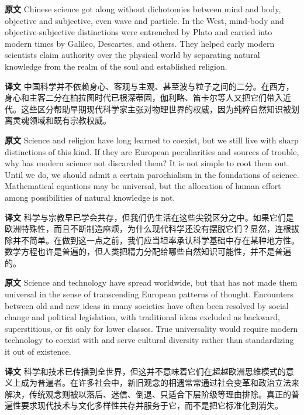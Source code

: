 \documentclass[UTF8,zihao=-4]{ctexart}
\newcommand{\BodyFont}{\fontsize{10.5pt}{15.5pt}\selectfont}
\newcommand{\origlabel}{\textbf{原文}\quad}
\newcommand{\translabel}{\textbf{译文}\quad}
\newenvironment{enblock}{\par\noindent\begingroup\BodyFont\origlabel}{\par\endgroup}
\newenvironment{zhblock}{\par\noindent\begingroup\BodyFont\translabel}{\par\endgroup\vspace{0.35em}}
\begin{document}
\begin{enblock}
Chinese science got along without dichotomies between mind and body, objective and subjective, even wave and particle. In the West, mind-body and objective-subjective distinctions were entrenched by Plato and carried into modern times by Galileo, Descartes, and others. They helped early modern scientists claim authority over the physical world by separating natural knowledge from the realm of the soul and established religion.
\end{enblock}
\begin{zhblock}
中国科学并不依赖身心、客观与主观、甚至波与粒子之间的二分。在西方，身心和主客二分在柏拉图时代已根深蒂固，伽利略、笛卡尔等人又把它们带入近代。这些区分帮助早期现代科学家主张对物理世界的权威，因为纯粹自然知识被划离灵魂领域和既有宗教权威。
\end{zhblock}

\begin{enblock}
Science and religion have long learned to coexist, but we still live with sharp distinctions of this kind. If they are European peculiarities and sources of trouble, why has modern science not discarded them? It is not simple to root them out. Until we do, we should admit a certain parochialism in the foundations of science. Mathematical equations may be universal, but the allocation of human effort among possibilities of natural knowledge is not.
\end{enblock}
\begin{zhblock}
科学与宗教早已学会共存，但我们仍生活在这些尖锐区分之中。如果它们是欧洲特殊性，而且不断制造麻烦，为什么现代科学还没有摆脱它们？显然，连根拔除并不简单。在做到这一点之前，我们应当坦率承认科学基础中存在某种地方性。数学方程也许是普遍的，但人类把精力分配给哪些自然知识可能性，并不是普遍的。
\end{zhblock}

\begin{enblock}
Science and technology have spread worldwide, but that has not made them universal in the sense of transcending European patterns of thought. Encounters between old and new ideas in many societies have often been resolved by social change and political legislation, with traditional ideas excluded as backward, superstitious, or fit only for lower classes. True universality would require modern technology to coexist with and serve cultural diversity rather than standardizing it out of existence.
\end{enblock}
\begin{zhblock}
科学和技术已传播到全世界，但这并不意味着它们在超越欧洲思维模式的意义上成为普遍者。在许多社会中，新旧观念的相遇常常通过社会变革和政治立法来解决，传统观念则被以落后、迷信、倒退、只适合下层阶级等理由排除。真正的普遍性要求现代技术与文化多样性共存并服务于它，而不是把它标准化到消失。
\end{zhblock}
\end{document}
